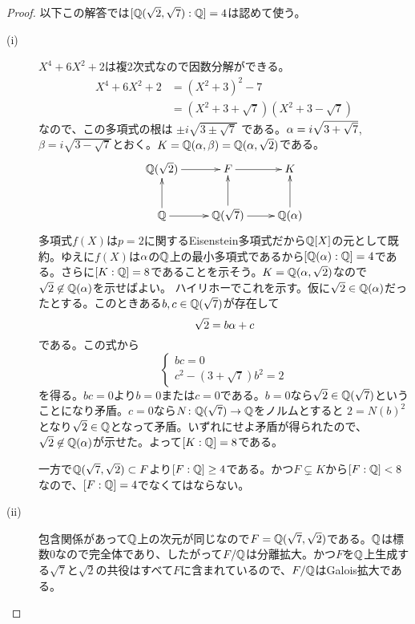\newpage


\subsubsection{} %
\begin{proof} 以下この解答では$[{\mathbb Q}(\sqrt{2},\sqrt{7}): {\mathbb Q} ] = 4$は認めて使う。
  \begin{description}
\item[(i)] $X^4 + 6X^2 + 2$は複2次式なので因数分解ができる。
 \begin{align*}
  X^4 + 6X^2 + 2 &= (X^2 + 3)^2 - 7 \\
  &= (X^2 + 3 + \sqrt{7} )(X^2 + 3 - \sqrt{7} )
  \end{align*}
  なので、この多項式の根は
  $
  \pm i \sqrt{ 3 \pm \sqrt{7}  }
  $
  である。${\alpha} = i \sqrt{ 3 + \sqrt{7}  }  $, $\beta = i \sqrt{ 3 - \sqrt{7}  } $とおく。$K = {\mathbb Q}({\alpha}, \beta) = {\mathbb Q}({\alpha}, \sqrt{2})$である。
  \[
  \xymatrix{
  \Q(\sqrt{2}) \ar[r] & F \ar[r] & K \\
  \Q \ar[u] \ar[r] & \Q(\sqrt{7}) \ar[r] \ar[u] & \Q(\gra) \ar[u]
  }
  \]
  多項式$f(X)$は$p=2$に関するEisenstein多項式だから${\mathbb Q}[X]$の元として既約。ゆえに$f(X)$は${\alpha}$の${\mathbb Q}$上の最小多項式であるから$[{\mathbb Q}({\alpha} ) : {\mathbb Q}] = 4$である。さらに$[K:{\mathbb Q}] = 8$であることを示そう。$K = {\mathbb Q}({\alpha}, \sqrt{2})$なので
  $\sqrt{2} \not\in {\mathbb Q}({\alpha})$を示せばよい。
  ハイリホーでこれを示す。仮に$\sqrt{2} \in {\mathbb Q}({\alpha})$だったとする。このときある$b,c \in {\mathbb Q}(\sqrt{7})$が存在して
  \[
  \sqrt{2} = b {\alpha} + c
  \]
  である。この式から
  \[
  \begin{cases}
    bc = 0 \\
    c^2 - (3 + \sqrt{7})b^2 = 2
  \end{cases}
  \]
を得る。$bc=0$より$b=0$または$c=0$である。$b=0$なら$\sqrt{2} \in {\mathbb Q}(\sqrt{7})$ということになり矛盾。$c=0$なら$N \colon {\mathbb Q}(\sqrt{7}) \to {\mathbb Q}$をノルムとすると
$
2 =  N(b)^2
$
となり$\sqrt{2} \in {\mathbb Q}$となって矛盾。いずれにせよ矛盾が得られたので、$\sqrt{2} \not\in {\mathbb Q}({\alpha})$が示せた。よって$[K:{\mathbb Q}] = 8$である。

  一方で${\mathbb Q}(\sqrt{7}, \sqrt{2}) \subset F$より$[F : {\mathbb Q}] \geq 4$である。かつ$F \subsetneq K$から$[F : {\mathbb Q}] < 8$なので、$[F : {\mathbb Q}] = 4$でなくてはならない。
  \item[(ii)] 包含関係があって${\mathbb Q}$上の次元が同じなので$F = {\mathbb Q}(\sqrt{7}, \sqrt{2})$である。${\mathbb Q}$は標数$0$なので完全体であり、したがって$F/{\mathbb Q}$は分離拡大。かつ$F$を${\mathbb Q}$上生成する$\sqrt{7}$と$\sqrt{2}$の共役はすべて$F$に含まれているので、$F/{\mathbb Q}$はGalois拡大である。
  \end{description}
\end{proof}



